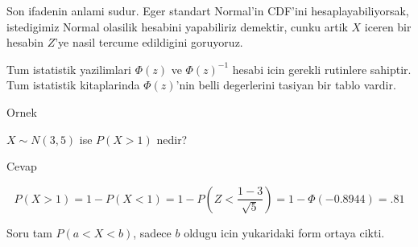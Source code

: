 \documentclass[12pt,fleqn]{article}\usepackage{../common}
\begin{document}
Son ifadenin anlami sudur. Eger standart Normal'in CDF'ini
hesaplayabiliyorsak, istedigimiz Normal olasilik hesabini yapabiliriz
demektir, cunku artik $X$ iceren bir hesabin $Z$'ye nasil tercume
edildigini goruyoruz. 

Tum istatistik yazilimlari $\Phi(z)$ ve $\Phi(z)^{-1}$ hesabi icin gerekli
rutinlere sahiptir. Tum istatistik kitaplarinda $\Phi(z)$'nin belli
degerlerini tasiyan bir tablo vardir.

Ornek 

$X \sim N(3,5)$ ise $P(X > 1)$ nedir? 

Cevap 

\[ P(X>1) = 1 - P(X < 1) = 1 - P( Z < \frac{ 1 - 3}{\sqrt{5 }}) = 
1 - \Phi(-0.8944) = .81
 \]

Soru tam $P(a  < X < b)$, sadece $b$ oldugu icin yukaridaki form ortaya
cikti. 
\end{document}
